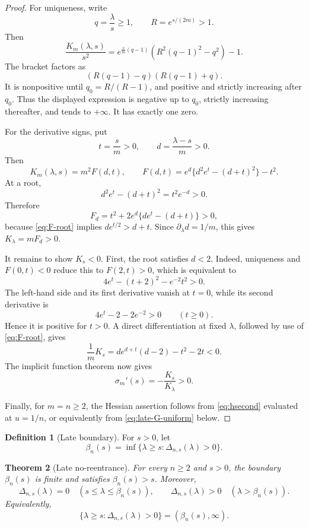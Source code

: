 \documentclass[11pt]{article}
\theoremstyle{plain}
\newtheorem{theorem}{Theorem}[section]
\theoremstyle{definition}
\newtheorem{definition}[theorem]{Definition}
\theoremstyle{remark}
\begin{document}
\begin{proof}
For uniqueness, write
\[
q=\frac\lambda s\ge1,
\qquad R=e^{s/(2m)}>1.
\]
Then
\[
\frac{K_m(\lambda,s)}{s^2}
=e^{\frac{s}{m}(q-1)}
\left(R^2(q-1)^2-q^2\right)-1.
\]
The bracket factors as
\[
(R(q-1)-q)(R(q-1)+q).
\]
It is nonpositive until \(q_0=R/(R-1)\), and positive and strictly increasing after \(q_0\).  Thus the displayed expression is negative up to \(q_0\), strictly increasing thereafter, and tends to \(+\infty\).  It has exactly one zero.

For the derivative signs, put
\[
t=\frac{s}{m}>0,
\qquad d=\frac{\lambda-s}{m}>0.
\]
Then
\[
K_m(\lambda,s)=m^2F(d,t),
\qquad
F(d,t)=e^d\{d^2e^t-(d+t)^2\}-t^2.
\]
At a root,
\begin{equation}\label{eq:F-root}
d^2e^t-(d+t)^2=t^2e^{-d}>0.
\end{equation}
Therefore
\[
F_d=t^2+2e^d\{de^t-(d+t)\}>0,
\]
because \eqref{eq:F-root} implies \(de^{t/2}>d+t\).  Since \(\partial_\lambda d=1/m\), this gives \(K_\lambda=mF_d>0\).

It remains to show \(K_s<0\).  First, the root satisfies \(d<2\).  Indeed, uniqueness and \(F(0,t)<0\) reduce this to \(F(2,t)>0\), which is equivalent to
\[
4e^t-(t+2)^2-e^{-2}t^2>0.
\]
The left-hand side and its first derivative vanish at \(t=0\), while its second derivative is
\[
4e^t-2-2e^{-2}>0
\qquad(t\ge0).
\]
Hence it is positive for \(t>0\).  A direct differentiation at fixed \(\lambda\), followed by use of \eqref{eq:F-root}, gives
\[
\frac1mK_s
=d e^{d+t}(d-2)-t^2-2t<0.
\]
The implicit function theorem now gives
\[
\sigma_m'(s)=-\frac{K_s}{K_\lambda}>0.
\]

Finally, for \(m=n\ge2\), the Hessian assertion follows from \eqref{eq:hsecond} evaluated at \(u=1/n\), or equivalently from \eqref{eq:late-G-uniform} below.
\end{proof}

\begin{definition}[Late boundary]
For \(s>0\), let
\begin{equation}\label{eq:beta-new}
\beta_n(s)=\inf\{\lambda\ge s:\Delta_{n,s}(\lambda)>0\}.
\end{equation}
\end{definition}

\begin{theorem}[Late no-reentrance]\label{thm:late-ray-new}
For every \(n\ge2\) and \(s>0\), the boundary \(\beta_n(s)\) is finite and satisfies \(\beta_n(s)>s\).  Moreover,
\begin{equation}\label{eq:late-ray-new}
\Delta_{n,s}(\lambda)=0
\quad(s\le\lambda\le\beta_n(s)),
\qquad
\Delta_{n,s}(\lambda)>0
\quad(\lambda>\beta_n(s)).
\end{equation}
Equivalently,
\[
\{\lambda\ge s:\Delta_{n,s}(\lambda)>0\}
=(\beta_n(s),\infty).
\]
\end{theorem}
\end{document}
